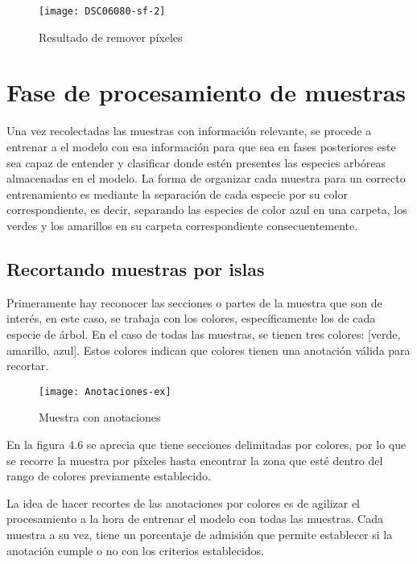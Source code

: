 \begin{figure} [!h]
	\centering
	\begin{minipage}[b]{0.65\textwidth}
		\texttt{[image: DSC06080-sf-2]}
		\caption{Resultado de remover píxeles}
	\end{minipage}
\end{figure}

\break

\section{Fase de procesamiento de muestras}
Una vez recolectadas las muestras con información relevante, se procede a  entrenar a el modelo con esa información para que sea en fases posteriores este sea capaz de entender y clasificar donde estén presentes las especies arbóreas almacenadas en el modelo. La forma de organizar cada muestra para un correcto entrenamiento es mediante la separación de cada especie por su color correspondiente, es decir, separando las especies de color azul en una carpeta, los verdes y los amarillos en su carpeta correspondiente consecuentemente.

\subsection{Recortando muestras por islas}
Primeramente hay reconocer las secciones o partes de la muestra que son de interés, en este caso, se trabaja con los colores, específicamente los de cada especie de árbol. En el caso de todas las muestras, se tienen tres colores: [verde, amarillo, azul]. Estos colores indican que colores tienen una anotación válida para recortar.


\begin{figure}[H]
  \centering
  \begin{minipage}[b]{0.65\textwidth}
        \texttt{[image: Anotaciones-ex]}
    \caption{Muestra con anotaciones}
  \end{minipage}
\end{figure}
\newpage

En la figura 4.6 se aprecia que tiene secciones delimitadas por colores, por lo que se recorre la muestra por píxeles hasta encontrar la zona que esté dentro del rango de colores previamente establecido.

La idea de hacer recortes de las anotaciones por colores es de agilizar el procesamiento a la hora de entrenar el modelo con todas las muestras. Cada muestra a su vez, tiene un porcentaje de admisión que permite establecer si la anotación cumple o no con los criterios establecidos.


